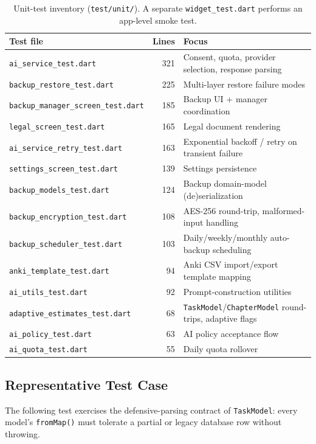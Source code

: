\documentclass[11pt,a4paper]{article}
\begin{document}
\begin{table}[h!]
\centering
\small
\begin{tabular}{p{5.6cm}rp{6cm}}
\toprule
\textbf{Test file} & \textbf{Lines} & \textbf{Focus} \\
\midrule
\texttt{ai\_service\_test.dart} & 321 & Consent, quota, provider selection, response parsing \\
\texttt{backup\_restore\_test.dart} & 225 & Multi-layer restore failure modes \\
\texttt{backup\_manager\_screen\_test.dart} & 185 & Backup UI + manager coordination \\
\texttt{legal\_screen\_test.dart} & 165 & Legal document rendering \\
\texttt{ai\_service\_retry\_test.dart} & 163 & Exponential backoff / retry on transient failure \\
\texttt{settings\_screen\_test.dart} & 139 & Settings persistence \\
\texttt{backup\_models\_test.dart} & 124 & Backup domain-model (de)serialization \\
\texttt{backup\_encryption\_test.dart} & 108 & AES-256 round-trip, malformed-input handling \\
\texttt{backup\_scheduler\_test.dart} & 103 & Daily/weekly/monthly auto-backup scheduling \\
\texttt{anki\_template\_test.dart} & 94 & Anki CSV import/export template mapping \\
\texttt{ai\_utils\_test.dart} & 92 & Prompt-construction utilities \\
\texttt{adaptive\_estimates\_test.dart} & 68 & \texttt{TaskModel}/\texttt{ChapterModel} round-trips, adaptive flags \\
\texttt{ai\_policy\_test.dart} & 63 & AI policy acceptance flow \\
\texttt{ai\_quota\_test.dart} & 55 & Daily quota rollover \\
\bottomrule
\end{tabular}
\caption{Unit-test inventory (\texttt{test/unit/}). A separate \texttt{widget\_test.dart} performs an app-level smoke test.}
\label{tab:tests}
\end{table}

\subsection{Representative Test Case}
The following test exercises the defensive-parsing contract of \texttt{TaskModel}: every model's \texttt{fromMap()} must tolerate a partial or legacy database row without throwing.
\end{document}
